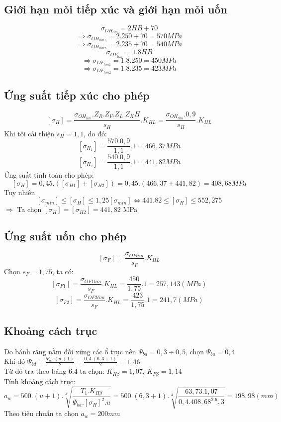 \subsection{Giới hạn mỏi tiếp xúc và giới hạn mỏi uốn}
\[
    \sigma_{OH_{lim}} = 2HB + 70 
\]
\[
    \Rightarrow \sigma_{OH_{lim1}} = 2.250 + 70 = 570MPa
\]
\[
    \Rightarrow \sigma_{OH_{lim2}} = 2.235 + 70 = 540MPa
\]
\[
    \sigma_{OF_{lim}} = 1.8HB
\]
\[
    \Rightarrow \sigma_{OF_{lim1}} = 1.8.250 = 450MPa
\]
\[
    \Rightarrow \sigma_{OF_{lim2}} = 1.8.235 = 423MPa
\]
\subsection{Ứng suất tiếp xúc cho phép}
\[
    [\sigma_{H}] = \frac{\sigma_{OH_{lim}}.Z_R.Z_V.Z_L.Z_XH}{s_H}.K_{HL} = \frac{\sigma_{OH_{lim}}.0,9}{s_H}.K_{HL}
\]
Khi tôi cải thiện $s_H = 1,1$, do đó:
\[
    [\sigma_{H_1}] = \frac{570.0,9}{1,1}.1 = 466,37MPa
\]
\[
    [\sigma_{H_2}] = \frac{540.0,9}{1,1}.1 = 441,82MPa
\]
Ứng suất tính toán cho phép:
\[
    [\sigma_H] = 0,45.([\sigma_{H1}] + [\sigma_{H2}]) = 0,45.(466,37 + 441,82) = 408,68MPa
\]
Tuy nhiên
\[
    [\sigma_{min}] \leq [\sigma_H] \leq 1,25[\sigma_{min}] \Leftrightarrow 441.82 \leq [\sigma_H] \leq 552,275
\]
$\Rightarrow$ Ta chọn $[\sigma_H] = [\sigma_{H2}] = 441,82$ MPa
\subsection{Ứng suất uốn cho phép}
\[
    [\sigma_F] =\frac{\sigma_{OFlim}}{s_F}.K_{HL}
\]
Chọn $s_F = 1,75$, ta có: \\
\[
    [\sigma_{F1}] =\frac{\sigma_{OF1lim}}{s_F}.K_{HL} = \frac{450}{1,75}.1 = 257,143 (MPa)
\]
\[
    [\sigma_{F2}] =\frac{\sigma_{OF2lim}}{s_F}.K_{HL} = \frac{423}{1,75}.1 = 241,7 (MPa)
\]
\subsection{Khoảng cách trục}
Do bánh răng nằm đối xứng các ổ trục nên $\Psi_{ba} = 0,3 \div 0,5$, chọn $\Psi_{ba} = 0,4$ \\
Khi đó $\Psi_{bd} = \frac{\Psi_{ba}.(u+1)}{2} = \frac{0,4.(6,3+1)}{2} = 1,46$ \\
Từ đó tra theo bảng 6.4 ta chọn: $K_{H\beta} = 1,07$, $K_{F\beta} = 1,14$ \\
Tính khoảng cách trục: \\
\[
    a_w = 500.(u+1).\sqrt[3]{\frac{T_1.K_{H\beta}}{\Psi_{ba}.[\sigma_H]^2.u}} = 500.(6,3+1).\sqrt[3]{\frac{63,73.1,07}{0,4.408,68^2.6,3}} = 198,98 (mm)
\]
Theo tiêu chuẩn ta chọn $a_w = 200mm$
